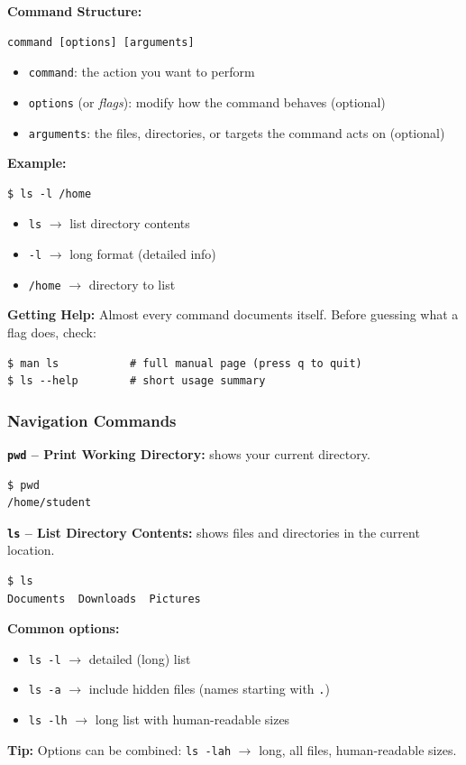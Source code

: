 \textbf{Command Structure:}
\begin{lstlisting}[language=Terminal]
command [options] [arguments]
\end{lstlisting}
\begin{itemize}
    \item \texttt{command}: the action you want to perform
    \item \texttt{options} (or \emph{flags}): modify how the command behaves (optional)
    \item \texttt{arguments}: the files, directories, or targets the command acts on (optional)
\end{itemize}

\textbf{Example:}
\begin{lstlisting}[language=Terminal]
$ ls -l /home
\end{lstlisting}
\begin{itemize}
    \item \texttt{ls} $\rightarrow$ list directory contents
    \item \texttt{-l} $\rightarrow$ long format (detailed info)
    \item \texttt{/home} $\rightarrow$ directory to list
\end{itemize}

\textbf{Getting Help:} Almost every command documents itself. Before guessing what a flag does, check:
\begin{lstlisting}[language=Terminal]
$ man ls           # full manual page (press q to quit)
$ ls --help        # short usage summary
\end{lstlisting}

\subsubsection{Navigation Commands}

\textbf{\texttt{pwd} -- Print Working Directory:} shows your current directory.
\begin{lstlisting}[language=Terminal]
$ pwd
/home/student
\end{lstlisting}

\textbf{\texttt{ls} -- List Directory Contents:} shows files and directories in the current location.
\begin{lstlisting}[language=Terminal]
$ ls
Documents  Downloads  Pictures
\end{lstlisting}
\textbf{Common options:}
\begin{itemize}
    \item \texttt{ls -l} $\rightarrow$ detailed (long) list
    \item \texttt{ls -a} $\rightarrow$ include hidden files (names starting with \texttt{.})
    \item \texttt{ls -lh} $\rightarrow$ long list with human-readable sizes
\end{itemize}
\textbf{Tip:} Options can be combined: \texttt{ls -lah} $\rightarrow$ long, all files, human-readable sizes.

